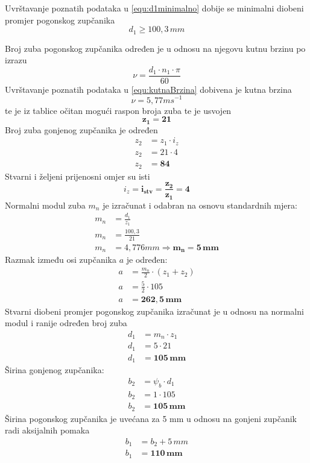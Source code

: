 \documentclass[11pt,a4paper]{report}
\begin{document}
Uvrštavanje poznatih podataka u \eqref{equ:d1minimalno} dobije se minimalni diobeni promjer pogonskog zupčanika $$d_1\geq 100,3\,mm$$

Broj zuba pogonskog zupčanika određen je u odnosu na njegovu kutnu brzinu po izrazu
\begin{equation}
\nu=\frac{d_1 \cdot n_1 \cdot \pi}{60}\label{equ:kutnaBrzina}
\end{equation}
Uvrštavanje poznatih podataka u \eqref{equ:kutnaBrzina} dobivena je kutna brzina
$$\nu=5,77 ms^{-1}$$
te je iz tablice \cite{potrebniMaterijali} očitan mogući raspon broja zuba te je usvojen 
$$\mathbf{z_1=21}$$
Broj zuba gonjenog zupčanika je određen
\begin{align*}
z_2&=z_1 \cdot i_z\\
z_2&=21 \cdot 4\\
z_2&=\mathbf{84}
\end{align*}
Stvarni i željeni prijenosni omjer su isti $$i_z=\mathbf{i_{stv}=\frac{z_2}{z_1}=4}$$
Normalni modul zuba $m_n$ je izračunat i odabran na osnovu standardnih mjera:
\begin{align*}
m_n&=\frac{d_1}{z_1}\\
m_n&=\frac{100,3}{21}\\
m_n&=4,776 mm \Rightarrow \mathbf{m_n=5\, mm}
\end{align*}
Razmak između osi zupčanika $a$ je određen:
\begin{align*}
a&=\frac{m_n}{2} \cdot (z_1 + z_2)\\
a&=\frac{5}{2} \cdot 105\\
a&=\mathbf{262,5\,mm}
\end{align*}
Stvarni diobeni promjer pogonskog zupčanika izračunat je u odnosu na normalni modul i ranije određen broj zuba
\begin{align*}
d_1&=m_n \cdot z_1\\
d_1&=5 \cdot 21\\
d_1&=\mathbf{105 \, mm}
\end{align*}
Širina gonjenog zupčanika:
\begin{align*}
b_2&=\psi_b \cdot d_1\\
b_2&=1 \cdot 105\\
b_2&=\mathbf{105 \,mm}
\end{align*}
Širina pogonskog zupčanika je uvećana za 5 mm u odnosu na gonjeni zupčanik radi aksijalnih pomaka
\begin{align*}
b_1&=b_2+5\,mm\\
b_1&=\mathbf{110 \,mm}
\end{align*}
\end{document}
